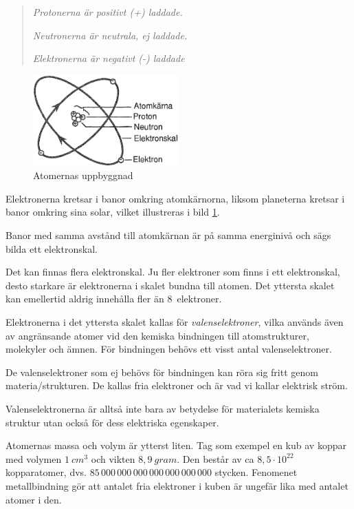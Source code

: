 \begin{quote}
\emph{Protonerna är positivt (+) laddade.}

\emph{Neutronerna är neutrala, ej laddade.}

\emph{Elektronerna är negativt (-) laddade}
\end{quote}

\begin{figure}
  \includegraphics[width=0.5\textwidth]{images/cropped_pdfs/bild_2_1-01.pdf}
  \caption{Atomernas uppbyggnad}
  \label{fig:BildII1-1}
  \vspace{-20pt}
\end{figure}

Elektronerna kretsar i banor omkring atomkärnorna, liksom
planeterna kretsar i banor omkring sina solar, vilket illustreras i bild
\ref{fig:BildII1-1}.

Banor med samma avstånd till atomkärnan är på samma energinivå och sägs bilda
ett elektronskal.

Det kan finnas flera elektronskal.
Ju fler elektroner som finns i ett elektronskal, desto starkare är elektronerna
i skalet bundna till atomen.
Det yttersta skalet kan emellertid aldrig innehålla fler än 8~elektroner.

Elektronerna i det yttersta skalet kallas för \emph{valenselektroner}, vilka
används även av angränsande atomer vid den kemiska bindningen till
atomstrukturer, molekyler och ämnen.
För bindningen behövs ett visst antal valenselektroner.

De valenselektroner som ej behövs för bindningen kan röra sig fritt genom
materia/strukturen.
De kallas fria elektroner och är vad vi kallar elektrisk ström.

Valenselektronerna är alltså inte bara av betydelse för materialets kemiska
struktur utan också för dess elektriska egenskaper.

Atomernas massa och volym är ytterst liten.
Tag som exempel en kub av koppar med volymen \(1\ cm^3\) och vikten
\(8,9\ gram\).
Den består av ca \(8,5 \cdot 10^{22}\) kopparatomer, dvs.
\(85\, 000\, 000\, 000\, 000\, 000\, 000\, 000\) stycken.
Fenomenet metallbindning gör att antalet fria elektroner i kuben är ungefär lika
med antalet atomer i den.

